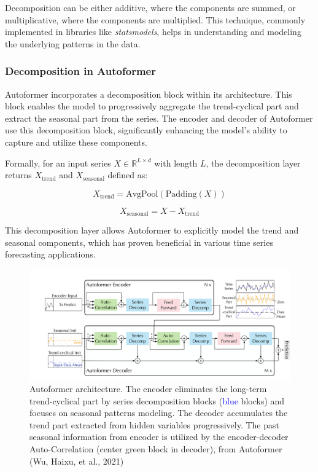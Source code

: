 Decomposition can be either additive, where the components are summed, or multiplicative, where the components are multiplied. This technique, commonly implemented in libraries like \textit{statsmodels}, helps in understanding and modeling the underlying patterns in the data.

\subsubsection{Decomposition in Autoformer}
Autoformer incorporates a decomposition block within its architecture. This block enables the model to progressively aggregate the trend-cyclical part and extract the seasonal part from the series. The encoder and decoder of Autoformer use this decomposition block, significantly enhancing the model’s ability to capture and utilize these components.

Formally, for an input series \( X \in \mathbb{R}^{L \times d} \) with length \( L \), the decomposition layer returns \( X_{\text{trend}} \) and \( X_{\text{seasonal}} \) defined as:

\begin{equation}
X_{\text{trend}} = \text{AvgPool}(\text{Padding}(X))
\end{equation}

\begin{equation}
X_{\text{seasonal}} = X - X_{\text{trend}}
\end{equation}

This decomposition layer allows Autoformer to explicitly model the trend and seasonal components, which has proven beneficial in various time series forecasting applications.

\begin{figure}[htbp]
    \centering
    \includegraphics[width=15cm]{3_ChapterTranformerVariants/figuras/AutoformerArchitecture.pdf}
    \caption{Autoformer architecture. The encoder eliminates the long-term trend-cyclical part by series decomposition blocks (\textcolor{blue}{blue} blocks) and focuses on seasonal patterns modeling. The decoder accumulates the trend part extracted from hidden variables progressively. The past seasonal information from encoder is utilized by the encoder-decoder Auto-Correlation (center \textcolor[rgb]{0.15,0.7,0.15}{green} block in decoder), from Autoformer (Wu, Haixu, et al., 2021)\cite{wu2022autoformerdecompositiontransformersautocorrelation}}
    \end{figure}



